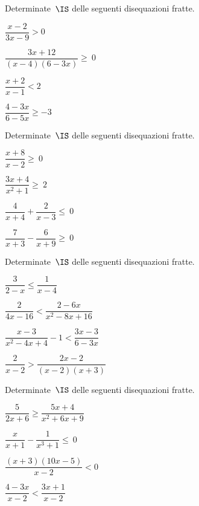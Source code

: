 \begin{esercizio}[\Ast]
\label{ese:21.55}
Determinate~\(\IS\) delle seguenti disequazioni fratte.
\begin{multicols}{2}
\begin{enumeratea}
\spazielenx
\item \(\dfrac{x-2}{3x-9}>0\)
\item \(\dfrac{3x+12}{(x-4)(6-3x)}\geqslant~0\)
\item \(\dfrac{x+2}{x-1}<2\)
\item \(\dfrac{4-3x}{6-5x}\geqslant -3\)
\end{enumeratea}
\end{multicols}
\end{esercizio}

\begin{esercizio}[\Ast]
\label{ese:21.56}
Determinate~\(\IS\) delle seguenti disequazioni fratte.
\begin{multicols}{2}
\begin{enumeratea}
\spazielenx
 \item \(\dfrac{x+8}{x-2}\ge~0\)
\item \(\dfrac{3x+4}{x^{2}+1}\ge~2\)
\item \(\dfrac{4}{x+4}+\dfrac{2}{x-3}\leqslant~0\)
\item \(\dfrac{7}{x+3}-\dfrac{6}{x+9}\geqslant~0\)
\end{enumeratea}
\end{multicols}
\end{esercizio}

\begin{esercizio}[\Ast]
\label{ese:21.57}
Determinate~\(\IS\) delle seguenti disequazioni fratte.
\begin{multicols}{2}
\begin{enumeratea}
\spazielenx
 \item \(\dfrac{3}{2-x}\leqslant \dfrac{1}{x-4}\)
\item \(\dfrac{2}{4x-16}<\dfrac{2-6x}{x^{2}-8x+16}\)
\item \(\dfrac{x-3}{x^{2}-4x+4}-1<\dfrac{3x-3}{6-3x}\)
\item \(\dfrac{2}{x-2}>\dfrac{2x-2}{(x-2)(x+3)}\)
\end{enumeratea}
\end{multicols}
\end{esercizio}

\begin{esercizio}[\Ast]
\label{ese:21.58}
Determinate~\(\IS\) delle seguenti disequazioni fratte.
\begin{multicols}{2}
\begin{enumeratea}
\spazielenx
 \item \(\dfrac{5}{2x+6}\geqslant \dfrac{5x+4}{x^{2}+6x+9}\)
\item \(\dfrac{x}{x+1}-\dfrac{1}{x^{3}+1}\le~0\)
\item \(\dfrac{(x+3)(10x-5)}{x-2}<0\)
\item \(\dfrac{4-3x}{x-2}<\dfrac{3x+1}{x-2}\)
\end{enumeratea}
\end{multicols}
\end{esercizio}

